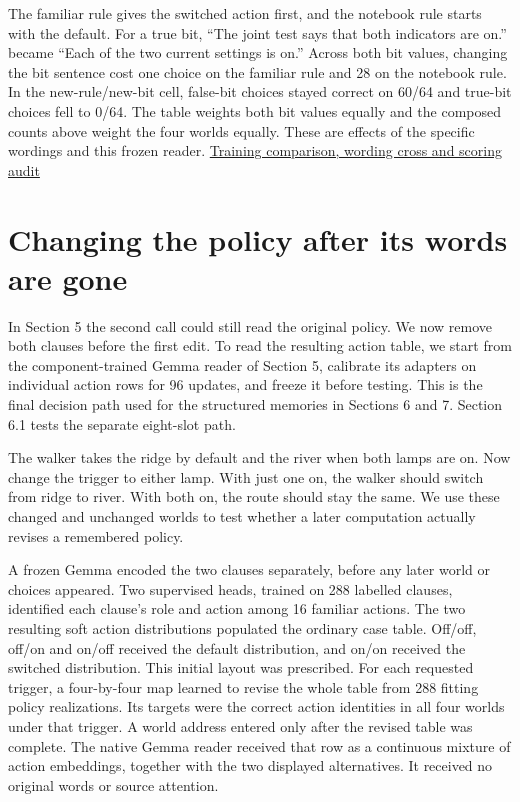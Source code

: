 \documentclass[11pt]{article}
\begin{document}
The familiar rule gives the switched action first, and the notebook rule starts with the default. For a true bit, ``The joint test says that both indicators are on.'' became ``Each of the two current settings is on.'' Across both bit values, changing the bit sentence cost one choice on the familiar rule and 28 on the notebook rule. In the new-rule/new-bit cell, false-bit choices stayed correct on 60/64 and true-bit choices fell to 0/64. The table weights both bit values equally and the composed counts above weight the four worlds equally. These are effects of the specific wordings and this frozen reader. \href{https://github.com/RyoSpiralArchitect/self-fold/blob/v1.0.0/provenance/stage_grammar_20261104/RESULTS.md#a-frozen-cross-of-grammar-bit-wording-and-question}{Training comparison, wording cross and scoring audit}

\section{Changing the policy after its words are gone}

In Section 5 the second call could still read the original policy. We now remove both clauses before the first edit. To read the resulting action table, we start from the component-trained Gemma reader of Section 5, calibrate its adapters on individual action rows for 96 updates, and freeze it before testing. This is the final decision path used for the structured memories in Sections 6 and 7. Section 6.1 tests the separate eight-slot path.

The walker takes the ridge by default and the river when both lamps are on. Now change the trigger to either lamp. With just one on, the walker should switch from ridge to river. With both on, the route should stay the same. We use these changed and unchanged worlds to test whether a later computation actually revises a remembered policy.

A frozen Gemma encoded the two clauses separately, before any later world or choices appeared. Two supervised heads, trained on 288 labelled clauses, identified each clause's role and action among 16 familiar actions. The two resulting soft action distributions populated the ordinary case table. Off/off, off/on and on/off received the default distribution, and on/on received the switched distribution. This initial layout was prescribed. For each requested trigger, a four-by-four map learned to revise the whole table from 288 fitting policy realizations. Its targets were the correct action identities in all four worlds under that trigger. A world address entered only after the revised table was complete. The native Gemma reader received that row as a continuous mixture of action embeddings, together with the two displayed alternatives. It received no original words or source attention.
\end{document}

